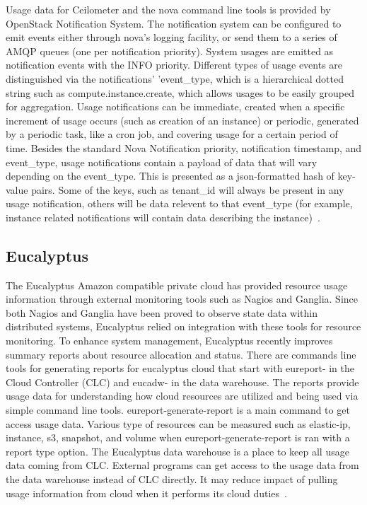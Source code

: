 \documentclass{sig-alternate}
\begin{document}
Usage data for Ceilometer and the nova command line tools is provided by OpenStack Notification System. The notification system can be configured to emit events either through nova's logging facility, or send them to a series of AMQP queues (one per notification priority). System usages are emitted as notification events with the INFO priority. Different types of usage events are distinguished via the notifications' 'event\_type, which is a hierarchical dotted string such as compute.instance.create, which allows usages to be easily grouped for aggregation. Usage notifications can be immediate, created when a specific increment of usage occurs (such as creation of an instance) or periodic, generated by a periodic task, like a cron job, and covering usage for a certain period of time. Besides the standard Nova Notification priority, notification timestamp, and event\_type, usage notifications contain a payload of data that will vary depending on the event\_type. This is presented as a json-formatted hash of key-value pairs. Some of the keys, such as tenant\_id will always be present in any usage notification, others will be data relevent to that event\_type (for example, instance related notifications will contain data describing the instance)~\cite{SystemUsageData}.

\subsection{Eucalyptus}

The Eucalyptus Amazon compatible private cloud has provided resource usage information through external monitoring tools such as Nagios and Ganglia. Since both Nagios and Ganglia have been proved to observe state data within distributed systems, Eucalyptus relied on integration with these tools for resource monitoring. To enhance system management, Eucalyptus recently improves summary reports about resource allocation and status. There are commands line tools for generating reports for eucalyptus cloud that start with eureport- in the Cloud Controller (CLC) and eucadw- in the data warehouse. The reports provide usage data for understanding how cloud resources are utilized and being used via simple command line tools. eureport-generate-report is a main command to get access usage data. Various type of resources can be measured such as elastic-ip, instance, s3, snapshot, and volume when eureport-generate-report is ran with a report type option. The Eucalyptus data warehouse is a place to keep all usage data coming from CLC. External programs can get access to the usage data from the data warehouse instead of CLC directly. It may reduce impact of pulling usage information from cloud when it performs its cloud duties~\cite{Euca2ools14}.
\end{document}
